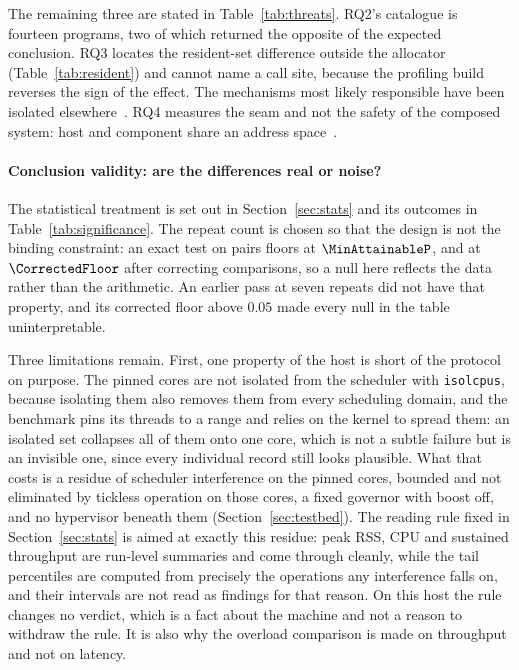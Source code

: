 The remaining three are stated in Table~\ref{tab:threats}. RQ2's catalogue is fourteen
programs, two of which returned the opposite of the expected conclusion. RQ3 locates the
resident-set difference outside the allocator (Table~\ref{tab:resident}) and cannot name a call
site, because the profiling build reverses the sign of the effect. The mechanisms most likely
responsible have been isolated elsewhere~\cite{zhang2022runtime,harris2023morello}. RQ4
measures the seam and not the safety of the composed system: host and component share an address
space~\cite{rivera2021galeed,kirth2022pkrusafe}.

\paragraph{Conclusion validity: are the differences real or noise?}
The statistical treatment is set out in Section~\ref{sec:stats} and its outcomes in
Table~\ref{tab:significance}. The repeat count is chosen so that the design is not the binding
constraint: an exact test on \NRepeats{} pairs floors at $\MinAttainableP$, and at
$\CorrectedFloor$ after correcting \NTests{} comparisons, so a null here reflects the data rather
than the arithmetic. An earlier pass at seven repeats did not have that property, and its
corrected floor above $0.05$ made every null in the table uninterpretable.

Three limitations remain. First, one property of the host is short of the protocol on purpose. The
pinned cores are not isolated from the scheduler with \texttt{isolcpus}, because isolating them
also removes them from every scheduling domain, and the benchmark pins its threads to a range and
relies on the kernel to spread them: an isolated set collapses all of them onto one core, which is
not a subtle failure but is an invisible one, since every individual record still looks plausible.
What that costs is a residue of scheduler interference on the pinned cores, bounded and not
eliminated by tickless operation on those cores, a fixed governor with boost off, and no
hypervisor beneath them (Section~\ref{sec:testbed}). The reading rule fixed in
Section~\ref{sec:stats} is aimed at exactly this residue: peak RSS, CPU and sustained throughput
are run-level summaries and come through cleanly, while the tail percentiles are computed from
precisely the operations any interference falls on, and their intervals are not read as findings
for that reason. On this host the rule changes no verdict, which is a fact about the machine and
not a reason to withdraw the rule. It is also why the overload comparison is made on throughput
and not on latency.


